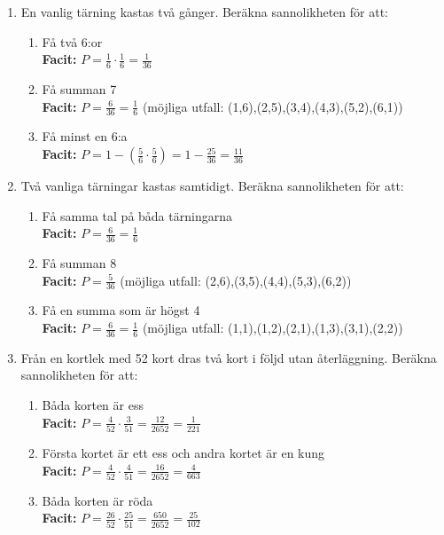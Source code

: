 \documentclass[a4paper,11pt]{article}
\begin{document}
\begin{enumerate}[label=\textbf{\arabic*.}]
    \item En vanlig tärning kastas två gånger. Beräkna sannolikheten för att:
    \begin{enumerate}[label=\alph*)]
        \item Få två 6:or
        \\ \textbf{Facit:} $P=\frac{1}{6}\cdot\frac{1}{6}=\frac{1}{36}$
        \item Få summan 7
        \\ \textbf{Facit:} $P=\frac{6}{36}=\frac{1}{6}$ (möjliga utfall: (1,6),(2,5),(3,4),(4,3),(5,2),(6,1))
        \item Få minst en 6:a
        \\ \textbf{Facit:} $P=1-(\frac{5}{6}\cdot\frac{5}{6})=1-\frac{25}{36}=\frac{11}{36}$
    \end{enumerate}
    
    \item Två vanliga tärningar kastas samtidigt. Beräkna sannolikheten för att:
    \begin{enumerate}[label=\alph*)]
        \item Få samma tal på båda tärningarna
        \\ \textbf{Facit:} $P=\frac{6}{36}=\frac{1}{6}$
        \item Få summan 8
        \\ \textbf{Facit:} $P=\frac{5}{36}$ (möjliga utfall: (2,6),(3,5),(4,4),(5,3),(6,2))
        \item Få en summa som är högst 4
        \\ \textbf{Facit:} $P=\frac{6}{36}=\frac{1}{6}$ (möjliga utfall: (1,1),(1,2),(2,1),(1,3),(3,1),(2,2))
    \end{enumerate}
    
    \item Från en kortlek med 52 kort dras två kort i följd utan återläggning. Beräkna sannolikheten för att:
    \begin{enumerate}[label=\alph*)]
        \item Båda korten är ess
        \\ \textbf{Facit:} $P=\frac{4}{52}\cdot\frac{3}{51}=\frac{12}{2652}=\frac{1}{221}$
        \item Första kortet är ett ess och andra kortet är en kung
        \\ \textbf{Facit:} $P=\frac{4}{52}\cdot\frac{4}{51}=\frac{16}{2652}=\frac{4}{663}$
        \item Båda korten är röda
        \\ \textbf{Facit:} $P=\frac{26}{52}\cdot\frac{25}{51}=\frac{650}{2652}=\frac{25}{102}$
    \end{enumerate}
    

\end{enumerate}
\end{document}
